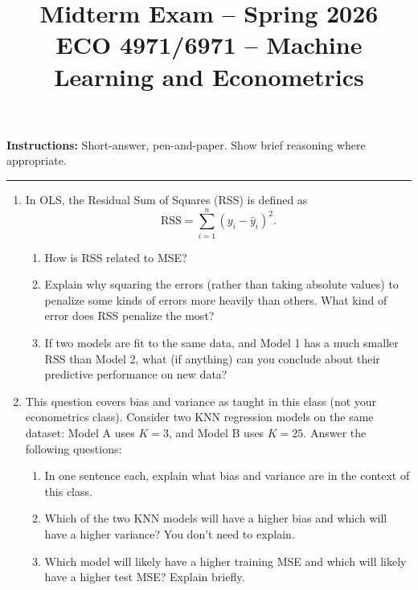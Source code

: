 \documentclass[11pt]{article}
\title{Midterm Exam -- Spring 2026\\[0.5em]
  \large ECO 4971/6971 -- Machine Learning and Econometrics}
\begin{document}
\maketitle
\noindent \textbf{Instructions:} Short-answer, pen-and-paper. Show brief reasoning where appropriate.

\bigskip
\hrule
\bigskip



\begin{enumerate}[leftmargin=*]

\item In OLS, the Residual Sum of Squares (RSS) is defined as
$$
  \text{RSS} = \sum_{i=1}^n (y_i - \hat{y}_i)^2.
$$

\begin{enumerate}
  \item How is RSS related to MSE? 
  \vspace{2cm}  
  
  \item Explain why squaring the errors (rather than taking absolute values) to penalize some kinds of errors more heavily than others. What kind of error does RSS penalize the most?
  \vspace{4cm}  
  \item If two models are fit to the same data, and Model 1 has a much smaller RSS than Model 2, what (if anything) can you conclude about their predictive performance on new data?
  \vspace{3cm}  
\end{enumerate}
 
\clearpage

\item This question covers bias and variance as taught in this class (not your econometrics class). Consider two KNN regression models on the same dataset: Model A uses $K=3$, and Model B uses $K=25$. Answer the following questions:  
\begin{enumerate}
  \item In one sentence each, explain what bias and variance are in the context of this class. 
  \vspace{3cm}  
  \item Which of the two KNN models will have a higher bias and which will have a higher variance? You don't need to explain. 
  \vspace{1cm}  
  \item Which model will likely have a higher training MSE and which will likely have a higher test MSE? Explain briefly. 
  \vspace{3cm}  
\end{enumerate}




\end{enumerate}
\end{document}
